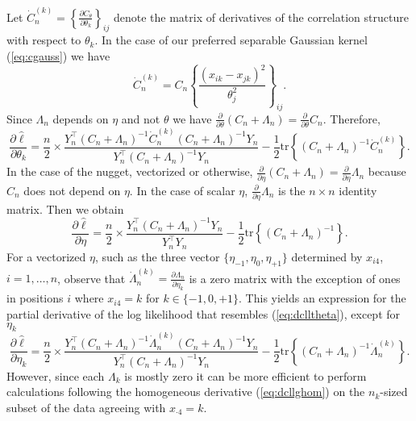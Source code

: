 \documentclass[12pt]{article}
\begin{document}
Let $\dot{C}^{(k)}_n = \left\{\frac{\partial C_\theta}{\partial \theta_k}\right\}_{ij}$ denote the
matrix of derivatives of the correlation structure with respect to
$\theta_k$.  In the case of our preferred separable Gaussian kernel (\ref{eq:cgauss}) we have
\[
\dot{C}^{(k)}_n = C_n \left\{\frac{(x_{ik} - x_{jk})^2}{\theta_j^2} \right\}_{ij}.
\]
Since $\Lambda_n$ depends on $\eta$ and not $\theta$ we have $\frac{\partial}{\partial \theta} (C_n + \Lambda_n) =
\frac{\partial}{\partial \theta} C_n$. Therefore,
\begin{equation}
\frac{\partial \hat{\ell}}{\partial \theta_k} = \frac{n}{2} \times 
\frac{Y_n^\top (C_n + \Lambda_n)^{-1} \dot{C}^{(k)}_n (C_n + \Lambda_n)^{-1} Y_n}{Y^\top_n 
(C_n + \Lambda_n)^{-1} Y_n} 
- \frac{1}{2} \mathrm{tr} \left\{(C_n + \Lambda_n)^{-1} \dot{C}^{(k)}_n \right\}.
\label{eq:dclltheta}
\end{equation}
In the case of the nugget, vectorized or otherwise,
$\frac{\partial}{\partial \eta} (C_n + \Lambda_n) = \frac{\partial}{\partial
\eta} \Lambda_n$ because $C_n$ does not depend on $\eta$.  In the case of scalar $\eta$,
$\frac{\partial}{\partial \eta} \Lambda_n$ is the $n\times n$ identity matrix.  Then we obtain
\begin{equation}
\frac{\partial \hat{\ell}}{\partial \eta} = \frac{n}{2} \times \frac{Y_n^\top (C_n 
+ \Lambda_n)^{-1} Y_n}{Y^\top_n Y_n} - \frac{1}{2} \mathrm{tr} \left\{(C_n + \Lambda_n)^{-1} \right\}.
\label{eq:dcllghom}
\end{equation}
For a vectorized $\eta$, such as the three vector $\{\eta_{-1}, \eta_0,
\eta_{+1}\}$ determined by $x_{i4}$, $i=1,\dots, n$, observe that
$\dot{\Lambda}_n^{(k)} = \frac{\partial \Lambda_n}{\partial \eta_k}$ is a zero
matrix with the exception of ones in positions $i$ where $x_{i4} = k$ for $k
\in \{-1, 0, +1\}$.  This yields an expression for the partial derivative of
the log likelihood that resembles (\ref{eq:dclltheta}), except for $\eta_k$
\begin{equation}
\frac{\partial \hat{\ell}}{\partial \eta_k} = \frac{n}{2} \times 
\frac{Y_n^\top (C_n + \Lambda_n)^{-1} \dot{\Lambda}^{(k)}_n (C_n + \Lambda_n)^{-1} Y_n}{Y^\top_n (C_n 
+ \Lambda_n)^{-1} Y_n} - \frac{1}{2} \mathrm{tr} \left\{(C_n + \Lambda_n)^{-1} \dot{\Lambda}^{(k)}_n \right\}.
\label{eq:dcllg}
\end{equation}
However, since each $\Lambda_k$ is mostly zero it can be more efficient to perform
calculations following the homogeneous derivative (\ref{eq:dcllghom}) on
the $n_k$-sized subset of the data agreeing with $x_{\cdot 4} = k$.
\end{document}
